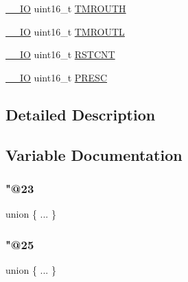 \begin{DoxyCompactItemize}
\item 
\mbox{\hyperlink{core__cm4_8h_aec43007d9998a0a0e01faede4133d6be}{\+\_\+\+\_\+\+IO}} uint16\+\_\+t \mbox{\hyperlink{group___v_r_e_f___peripheral___access___layer_ga020e8a3bc802277ebdea61f18a256c65}{T\+M\+R\+O\+U\+TH}}
\item 
\mbox{\hyperlink{core__cm4_8h_aec43007d9998a0a0e01faede4133d6be}{\+\_\+\+\_\+\+IO}} uint16\+\_\+t \mbox{\hyperlink{group___v_r_e_f___peripheral___access___layer_gad5ebd770efd696047aa4ac98538a798d}{T\+M\+R\+O\+U\+TL}}
\item 
\mbox{\hyperlink{core__cm4_8h_aec43007d9998a0a0e01faede4133d6be}{\+\_\+\+\_\+\+IO}} uint16\+\_\+t \mbox{\hyperlink{group___v_r_e_f___peripheral___access___layer_ga095ee56174bca40b8f3b42792b2aa554}{R\+S\+T\+C\+NT}}
\item 
\mbox{\hyperlink{core__cm4_8h_aec43007d9998a0a0e01faede4133d6be}{\+\_\+\+\_\+\+IO}} uint16\+\_\+t \mbox{\hyperlink{group___v_r_e_f___peripheral___access___layer_gac91805542c28a212cea60963b3983981}{P\+R\+E\+SC}}
\end{DoxyCompactItemize}


\subsection{Detailed Description}


\subsection{Variable Documentation}
\mbox{\label{group___v_r_e_f___peripheral___access___layer_ga3b845ed529f71b70ef258feb7b6eba7c}} 
\subsubsection{\texorpdfstring{"@23}{@23}}
{\footnotesize\ttfamily union \{ ... \} }

\mbox{\label{group___v_r_e_f___peripheral___access___layer_ga688a5ffc9c36006a7dd53b7cd72d7873}} 
\subsubsection{\texorpdfstring{"@25}{@25}}
{\footnotesize\ttfamily union \{ ... \} }

\mbox{\label{group___v_r_e_f___peripheral___access___layer_gab2cbecae6cd8d7f6a63f73dd22b05499}} 
